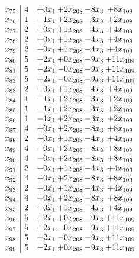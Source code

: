 \documentclass[11pt]{article}
\begin{document}
\[\begin{array}{c| c c@{\hskip 2pt} c@{\hskip 2pt} c@{\hskip 2pt} c@{\hskip 2pt} }
 x_{75}   &  4 & + 0 x_{1} & + 2 x_{208} & -8 x_{3} & + 8 x_{109}\\
 x_{76}   &  1 & -1 x_{1} & + 2 x_{208} & -3 x_{3} & + 2 x_{109}\\
 x_{77}   &  2 & + 0 x_{1} & + 1 x_{208} & -4 x_{3} & + 4 x_{109}\\
 x_{78}   &  2 & + 0 x_{1} & + 1 x_{208} & -4 x_{3} & + 4 x_{109}\\
 x_{79}   &  2 & + 0 x_{1} & + 1 x_{208} & -4 x_{3} & + 4 x_{109}\\
 x_{80}   &  5 & + 2 x_{1} & + 0 x_{208} & -9 x_{3} & + 11 x_{109}\\
 x_{81}   &  5 & + 2 x_{1} & -0 x_{208} & -9 x_{3} & + 11 x_{109}\\
 x_{82}   &  5 & + 2 x_{1} & -0 x_{208} & -9 x_{3} & + 11 x_{109}\\
 x_{83}   &  2 & + 0 x_{1} & + 1 x_{208} & -4 x_{3} & + 4 x_{109}\\
 x_{84}   &  1 & -1 x_{1} & + 2 x_{208} & -3 x_{3} & + 2 x_{109}\\
 x_{85}   &  1 & -1 x_{1} & + 2 x_{208} & -3 x_{3} & + 2 x_{109}\\
 x_{86}   &  1 & -1 x_{1} & + 2 x_{208} & -3 x_{3} & + 2 x_{109}\\
 x_{87}   &  4 & + 0 x_{1} & + 2 x_{208} & -8 x_{3} & + 8 x_{109}\\
 x_{88}   &  2 & + 0 x_{1} & + 1 x_{208} & -4 x_{3} & + 4 x_{109}\\
 x_{89}   &  4 & + 0 x_{1} & + 2 x_{208} & -8 x_{3} & + 8 x_{109}\\
 x_{90}   &  4 & -0 x_{1} & + 2 x_{208} & -8 x_{3} & + 8 x_{109}\\
 x_{91}   &  2 & + 0 x_{1} & + 1 x_{208} & -4 x_{3} & + 4 x_{109}\\
 x_{92}   &  4 & + 0 x_{1} & + 2 x_{208} & -8 x_{3} & + 8 x_{109}\\
 x_{93}   &  2 & + 0 x_{1} & + 1 x_{208} & -4 x_{3} & + 4 x_{109}\\
 x_{94}   &  4 & + 0 x_{1} & + 2 x_{208} & -8 x_{3} & + 8 x_{109}\\
 x_{95}   &  2 & + 0 x_{1} & + 1 x_{208} & -4 x_{3} & + 4 x_{109}\\
 x_{96}   &  5 & + 2 x_{1} & + 0 x_{208} & -9 x_{3} & + 11 x_{109}\\
 x_{97}   &  5 & + 2 x_{1} & -0 x_{208} & -9 x_{3} & + 11 x_{109}\\
 x_{98}   &  5 & + 2 x_{1} & -0 x_{208} & -9 x_{3} & + 11 x_{109}\\
 x_{99}   &  5 & + 2 x_{1} & + 0 x_{208} & -9 x_{3} & + 11 x_{109}\\

\end{array}\]
\end{document}
